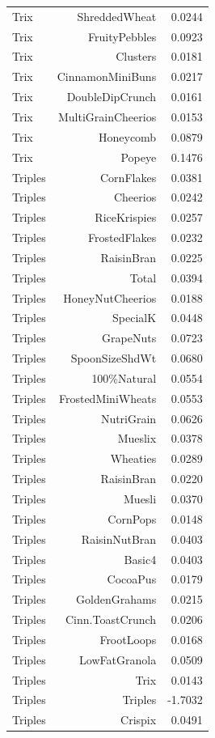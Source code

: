 \begin{longtable}{@{}lrr@{}}
Trix & ShreddedWheat & 0.0244 \\
Trix & FruityPebbles & 0.0923 \\
Trix & Clusters & 0.0181 \\
Trix & CinnamonMiniBuns & 0.0217 \\
Trix & DoubleDipCrunch & 0.0161 \\
Trix & MultiGrainCheerios & 0.0153 \\
Trix & Honeycomb & 0.0879 \\
Trix & Popeye & 0.1476 \\
Triples & CornFlakes & 0.0381 \\
Triples & Cheerios & 0.0242 \\
Triples & RiceKrispies & 0.0257 \\
Triples & FrostedFlakes & 0.0232 \\
Triples & RaisinBran & 0.0225 \\
Triples & Total & 0.0394 \\
Triples & HoneyNutCheerios & 0.0188 \\
Triples & SpecialK & 0.0448 \\
Triples & GrapeNuts & 0.0723 \\
Triples & SpoonSizeShdWt & 0.0680 \\
Triples & 100\%Natural & 0.0554 \\
Triples & FrostedMiniWheats & 0.0553 \\
Triples & NutriGrain & 0.0626 \\
Triples & Mueslix & 0.0378 \\
Triples & Wheaties & 0.0289 \\
Triples & RaisinBran & 0.0220 \\
Triples & Muesli & 0.0370 \\
Triples & CornPops & 0.0148 \\
Triples & RaisinNutBran & 0.0403 \\
Triples & Basic4 & 0.0403 \\
Triples & CocoaPus & 0.0179 \\
Triples & GoldenGrahams & 0.0215 \\
Triples & Cinn.ToastCrunch & 0.0206 \\
Triples & FrootLoops & 0.0168 \\
Triples & LowFatGranola & 0.0509 \\
Triples & Trix & 0.0143 \\
Triples & Triples & -1.7032 \\
Triples & Crispix & 0.0491 \\

\end{longtable}
